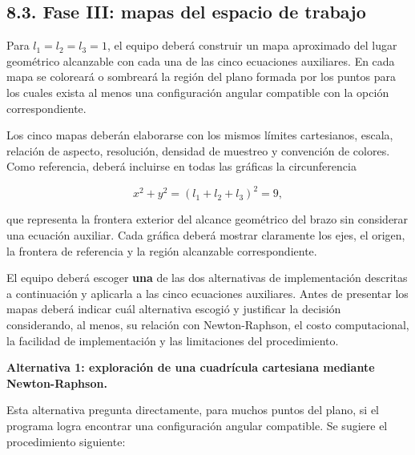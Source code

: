 \documentclass[12pt]{article}
\begin{document}
\subsection*{8.3. Fase III: mapas del espacio de trabajo}

Para \(l_1=l_2=l_3=1\), el equipo deberá construir un mapa aproximado del lugar geométrico alcanzable con cada una de las cinco ecuaciones auxiliares. En cada mapa se coloreará o sombreará la región del plano formada por los puntos para los cuales exista al menos una configuración angular compatible con la opción correspondiente.

Los cinco mapas deberán elaborarse con los mismos límites cartesianos, escala, relación de aspecto, resolución, densidad de muestreo y convención de colores. Como referencia, deberá incluirse en todas las gráficas la circunferencia

\[
x^2+y^2=(l_1+l_2+l_3)^2=9,
\]

que representa la frontera exterior del alcance geométrico del brazo sin considerar una ecuación auxiliar. Cada gráfica deberá mostrar claramente los ejes, el origen, la frontera de referencia y la región alcanzable correspondiente.

El equipo deberá escoger \textbf{una} de las dos alternativas de implementación descritas a continuación y aplicarla a las cinco ecuaciones auxiliares. Antes de presentar los mapas deberá indicar cuál alternativa escogió y justificar la decisión considerando, al menos, su relación con Newton-Raphson, el costo computacional, la facilidad de implementación y las limitaciones del procedimiento.

\textbf{Alternativa 1: exploración de una cuadrícula cartesiana mediante Newton-Raphson.}

Esta alternativa pregunta directamente, para muchos puntos del plano, si el programa logra encontrar una configuración angular compatible. Se sugiere el procedimiento siguiente:
\end{document}
